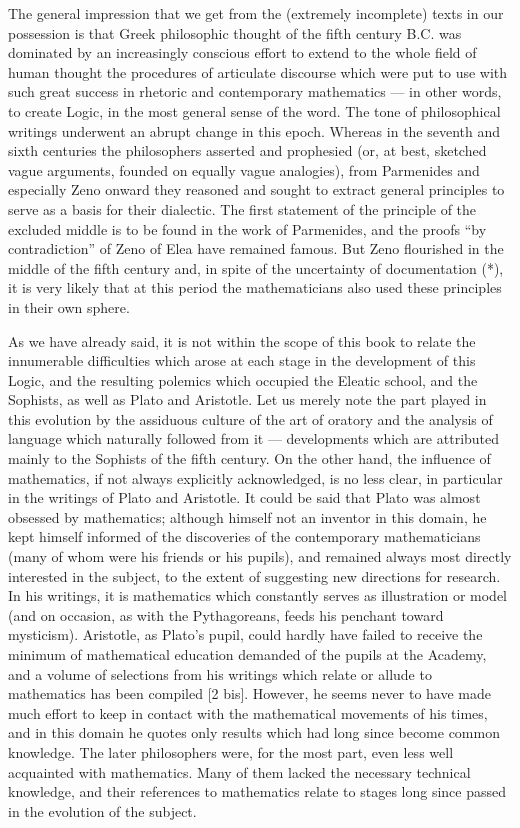 The general impression that we get from the (extremely incomplete) texts in our possession is that Greek philosophic thought of the fifth century B.C. was dominated by an increasingly conscious effort to extend to the whole field of human thought the procedures of articulate discourse which were put to use with such great success in rhetoric and contemporary mathematics --- in other words, to create Logic, in the most general sense of the word. The tone of philosophical writings underwent an abrupt change in this epoch. Whereas in the seventh and sixth centuries the philosophers asserted and prophesied (or, at best, sketched vague arguments, founded on equally vague analogies), from Parmenides and especially Zeno onward they reasoned and sought to extract general principles to serve as a basis for their dialectic. The first statement of the principle of the excluded middle is to be found in the work of Parmenides, and the proofs ``by contradiction'' of Zeno of Elea have remained famous. But Zeno flourished in the middle of the fifth century and, in spite of the uncertainty of documentation (*), it is very likely that at this period the mathematicians also used these principles in their own sphere.

As we have already said, it is not within the scope of this book to relate the innumerable difficulties which arose at each stage in the development of this Logic, and the resulting polemics which occupied the Eleatic school, and the Sophists, as well as Plato and Aristotle. Let us merely note the part played in this evolution by the assiduous culture of the art of oratory and the analysis of language which naturally followed from it --- developments which are attributed mainly to the Sophists of the fifth century. On the other hand, the influence of mathematics, if not always explicitly acknowledged, is no less clear, in particular in the writings of Plato and Aristotle. It could be said that Plato was almost obsessed by mathematics; although himself not an inventor in this domain, he kept himself informed of the discoveries of the contemporary mathematicians (many of whom were his friends or his pupils), and remained always most directly interested in the subject, to the extent of suggesting new directions for research. In his writings, it is mathematics which constantly serves as illustration or model (and on occasion, as with the Pythagoreans, feeds his penchant toward mysticism). Aristotle, as Plato's pupil, could hardly have failed to receive the minimum of mathematical education demanded of the pupils at the Academy, and a volume of selections from his writings which relate or allude to mathematics has been compiled {[}2 bis{]}. However, he seems never to have made much effort to keep in contact with the mathematical movements of his times, and in this domain he quotes only results which had long since become common knowledge. The later philosophers were, for the most part, even less well acquainted with mathematics. Many of them lacked the necessary technical knowledge, and their references to mathematics relate to stages long since passed in the evolution of the subject.

